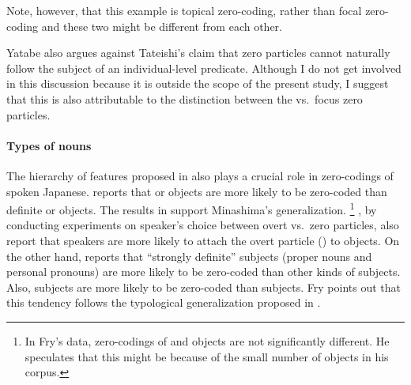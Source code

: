 Note, however, that this example is topical zero-coding,
rather than focal zero-coding and
these two might be different from each other.

Yatabe also argues against Tateishi's claim that
zero particles cannot naturally follow
the subject of an individual-level predicate.
Although I do not get involved in this discussion
because it is outside the scope of the present study,
I suggest that this is also attributable to
the distinction between the  vs.~focus zero particles.
%


\paragraph{Types of nouns}

The hierarchy of features proposed in 
also plays a crucial role in zero-codings of spoken Japanese.
 reports that
 or  objects are more likely to be zero-coded
than definite or  objects.
The results in  support Minashima's generalization.%
 \footnote{
 In Fry's data, zero-codings of  and  objects are not
 significantly different.
 He speculates that this might be because of the small number of
  objects in his corpus.
 }
, by conducting experiments on speaker's choice between overt vs.~zero particles,
also report that speakers are more likely to attach the overt particle () to  objects.
On the other hand,
 reports that
``strongly definite'' subjects (proper nouns and personal pronouns)
are more likely to be zero-coded than other kinds of subjects.
Also,  subjects are more likely to be zero-coded than
 subjects.
Fry points out that this tendency follows the typological generalization
proposed in .

